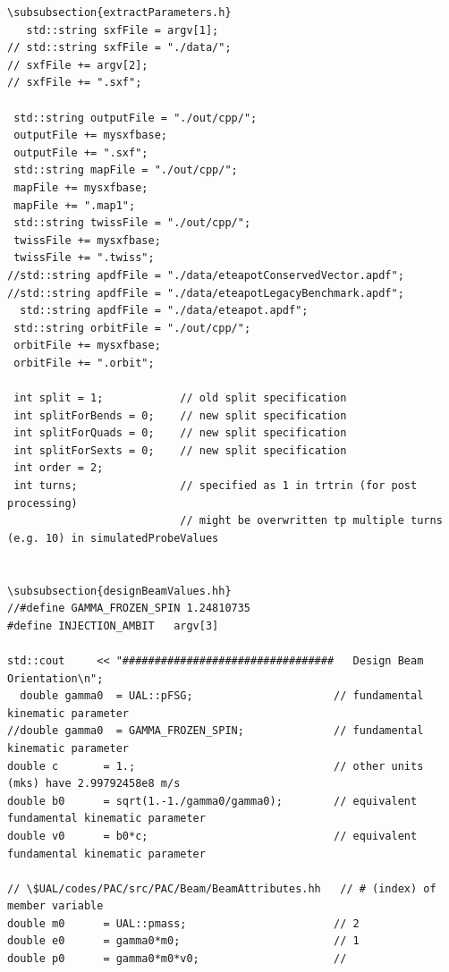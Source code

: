 \documentclass[]{article}
\begin{document}
\begin{verbatim}
\subsubsection{extractParameters.h}
   std::string sxfFile = argv[1];
// std::string sxfFile = "./data/";
// sxfFile += argv[2];
// sxfFile += ".sxf";

 std::string outputFile = "./out/cpp/";
 outputFile += mysxfbase;
 outputFile += ".sxf";
 std::string mapFile = "./out/cpp/";
 mapFile += mysxfbase;
 mapFile += ".map1";
 std::string twissFile = "./out/cpp/";
 twissFile += mysxfbase;
 twissFile += ".twiss";
//std::string apdfFile = "./data/eteapotConservedVector.apdf";
//std::string apdfFile = "./data/eteapotLegacyBenchmark.apdf";
  std::string apdfFile = "./data/eteapot.apdf";
 std::string orbitFile = "./out/cpp/";
 orbitFile += mysxfbase;
 orbitFile += ".orbit";

 int split = 1;            // old split specification
 int splitForBends = 0;    // new split specification
 int splitForQuads = 0;    // new split specification
 int splitForSexts = 0;    // new split specification
 int order = 2;
 int turns;                // specified as 1 in trtrin (for post processing)
                           // might be overwritten tp multiple turns (e.g. 10) in simulatedProbeValues


\subsubsection{designBeamValues.hh}
//#define GAMMA_FROZEN_SPIN 1.24810735
#define INJECTION_AMBIT   argv[3]

std::cout     << "#################################   Design Beam Orientation\n";
  double gamma0  = UAL::pFSG;                      // fundamental kinematic parameter
//double gamma0  = GAMMA_FROZEN_SPIN;              // fundamental kinematic parameter
double c       = 1.;                               // other units (mks) have 2.99792458e8 m/s
double b0      = sqrt(1.-1./gamma0/gamma0);        // equivalent fundamental kinematic parameter
double v0      = b0*c;                             // equivalent fundamental kinematic parameter

// \$UAL/codes/PAC/src/PAC/Beam/BeamAttributes.hh   // # (index) of member variable
double m0      = UAL::pmass;                       // 2
double e0      = gamma0*m0;                        // 1
double p0      = gamma0*m0*v0;                     //


\end{verbatim}
\end{document}
